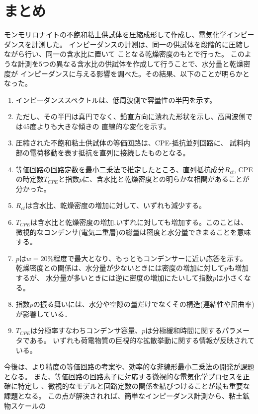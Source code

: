 \documentclass{jsce}
\begin{document}
\section{まとめ}
モンモリロナイトの不飽和粘土供試体を圧縮成形して作成し、電気化学インピーダンスを計測した。
インピーダンスの計測は、同一の供試体を段階的に圧縮しながら行い、同一の含水比に置いて
ことなる乾燥密度のもとで行った。
このような計測を5つの異なる含水比の供試体を作成して行うことで、水分量と乾燥密度が
インピーダンスに与える影響を調べた。その結果、以下のことが明らかとなった。
\begin{enumerate}
\item
        インピーダンススペクトルは、低周波側で容量性の半円を示す。
\item
        ただし、その半円は真円でなく、鉛直方向に潰れた形状を示し、高周波側では45度よりも大きな傾きの
        直線的な変化を示す。
\item
        圧縮された不飽和粘土供試体の等価回路は、CPE-抵抗並列回路に、
        試料内部の電荷移動を表す抵抗を直列に接続したものとなる。
\item
        等価回路の回路定数を最小二乗法で推定したところ、直列抵抗成分$R_{ct}$,
                CPEの時定数$T_{CPE}$と指数$p$に、含水比と乾燥密度との明らかな相関があることが分かった。
\item
        $R_{ct}$は含水比、乾燥密度の増加に対して、いずれも減少する。
\item
        $T_{CPE}$は含水比と乾燥密度の増加,いずれに対しても増加する。このことは、
        微視的なコンデンサ(電気二重層)の総量は密度と水分量できまることを意味する。
\item
        $p$は$w=20\%$程度で最大となり、もっともコンデンサーに近い応答を示す。
        乾燥密度との関係は、水分量が少ないときには密度の増加に対して$p$も増加するが、
        水分量が多いときには逆に密度の増加にたいして指数$p$は小さくなる。
\item
        指数$p$の振る舞いには、水分や空隙の量だけでなくその構造(連結性や屈曲率)が影響している．
\item
        $T_{CPE}$は分極率すなわちコンデンサ容量、$p$は分極緩和時間に関するパラメータである。
        いずれも荷電物質の巨視的な拡散挙動に関する情報が反映されている。
\end{enumerate}
今後は、より精度の等価回路の考案や、効率的な非線形最小二乗法の開発が課題となる。
また、等価回路の回路素子に対応する微視的な電気化学プロセスを正確に特定し
、微視的なモデルと回路定数の関係を結びつけることが最も重要な課題となる。
この点が解決されれば、簡単なインピーダンス計測から、粘土鉱物スケールの
\end{document}
